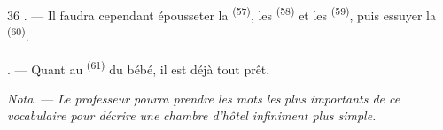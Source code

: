 \begin{VUpage}[38]{36}
. --- Il faudra cependant épousseter la  \textsuperscript{(57)},\nl
les  \textsuperscript{(58)} et les  \textsuperscript{(59)}, puis\nl
essuyer la  \textsuperscript{(60)}.

. --- Quant au  \textsuperscript{(61)} du bébé, il est déjà\nl
tout prêt.

\VUblancAlinea
\textit{Nota.} --- \textit{Le professeur pourra prendre les mots les}\nl
\textit{plus importants de ce vocabulaire pour décrire une}\nl
\textit{chambre d'hôtel infiniment plus simple.}
\end{VUpage}

